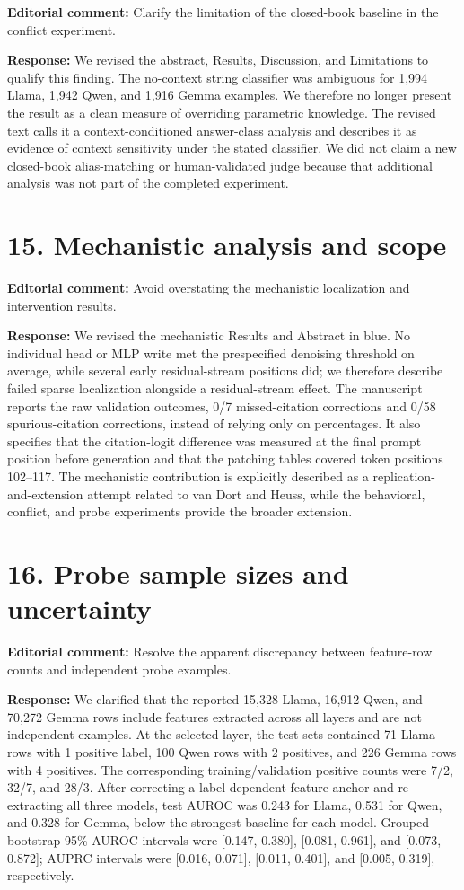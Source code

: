 \documentclass[11pt]{article}
\begin{document}
\textbf{Editorial comment:} Clarify the limitation of the closed-book baseline in the conflict experiment.

\textbf{Response:} We revised the abstract, Results, Discussion, and Limitations to qualify this finding. The no-context string classifier was ambiguous for 1,994 Llama, 1,942 Qwen, and 1,916 Gemma examples. We therefore no longer present the result as a clean measure of overriding parametric knowledge. The revised text calls it a context-conditioned answer-class analysis and describes it as evidence of context sensitivity under the stated classifier. We did not claim a new closed-book alias-matching or human-validated judge because that additional analysis was not part of the completed experiment.

\section*{15. Mechanistic analysis and scope}

\textbf{Editorial comment:} Avoid overstating the mechanistic localization and intervention results.

\textbf{Response:} We revised the mechanistic Results and Abstract in blue. No individual head or MLP write met the prespecified denoising threshold on average, while several early residual-stream positions did; we therefore describe failed sparse localization alongside a residual-stream effect. The manuscript reports the raw validation outcomes, 0/7 missed-citation corrections and 0/58 spurious-citation corrections, instead of relying only on percentages. It also specifies that the citation-logit difference was measured at the final prompt position before generation and that the patching tables covered token positions 102--117. The mechanistic contribution is explicitly described as a replication-and-extension attempt related to van Dort and Heuss, while the behavioral, conflict, and probe experiments provide the broader extension.

\section*{16. Probe sample sizes and uncertainty}

\textbf{Editorial comment:} Resolve the apparent discrepancy between feature-row counts and independent probe examples.

\textbf{Response:} We clarified that the reported 15,328 Llama, 16,912 Qwen, and 70,272 Gemma rows include features extracted across all layers and are not independent examples. At the selected layer, the test sets contained 71 Llama rows with 1 positive label, 100 Qwen rows with 2 positives, and 226 Gemma rows with 4 positives. The corresponding training/validation positive counts were 7/2, 32/7, and 28/3. After correcting a label-dependent feature anchor and re-extracting all three models, test AUROC was 0.243 for Llama, 0.531 for Qwen, and 0.328 for Gemma, below the strongest baseline for each model. Grouped-bootstrap 95\% AUROC intervals were [0.147, 0.380], [0.081, 0.961], and [0.073, 0.872]; AUPRC intervals were [0.016, 0.071], [0.011, 0.401], and [0.005, 0.319], respectively.
\end{document}
